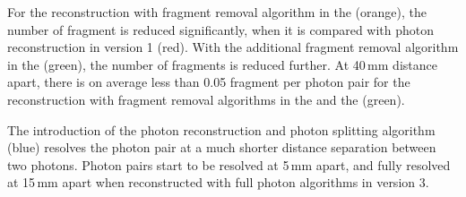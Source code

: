 

For the reconstruction with fragment removal algorithm in the \ECAL (orange), the number of fragment is reduced significantly, when it is compared with photon reconstruction in \pandora version 1 (red). With the additional fragment removal algorithm in the \HCAL (green), the number of fragments is reduced further. At 40\,mm distance apart,  there is on average less than 0.05 fragment per photon pair for the reconstruction with fragment removal algorithms in the \ECAL and the \HCAL  (green).

The introduction of the photon reconstruction and photon splitting algorithm (blue) resolves the photon pair at a much shorter distance separation between two photons. Photon pairs start to be resolved at 5\,mm apart, and fully resolved at 15\,mm apart when reconstructed with full photon algorithms in \pandora version 3.


